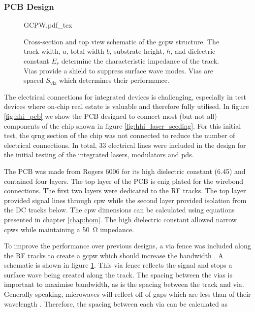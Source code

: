 
\subsubsection*{PCB Design}

\begin{figure}[t]
	\centering	
	\def\svgwidth{\textwidth} 
	{GCPW.pdf_tex}
	\caption[Grounded coplanar waveguide schematic]{Cross-section and top view schematic of the \acf{gcpw} structure. The track width, $a$, total width $b$, substrate height, $h$, and dielectric constant $E_r$ determine the characteristic impedance of the track. Vias provide a shield to suppress surface wave modes. Vias are spaced $S_\text{via}$ which determines their performance.}
	\label{fig:gcpw}
\end{figure}

The electrical connections for integrated devices is challenging, especially in test devices where on-chip real estate is valuable and therefore fully utilised. In figure \ref{fig:hhi_pcb} we show the PCB designed to connect most (but not all) components of the chip shown in figure \ref{fig:hhi_laser_seeding}. For this initial test, the \ac{qrng} section of the chip was not connected to reduce the number of electrical connections. In total, 33 electrical lines were included in the design for the initial testing of the integrated lasers, modulators and \acp{pd}.

The PCB was made from Rogers 6006 for its high dielectric constant (6.45) and contained four layers. The top layer of the PCB is \ac{enig} plated for the wirebond connections. The first two layers were dedicated to the RF tracks. The top layer provided signal lines through \ac{cpw} while the second layer provided isolation from the DC tracks below. The \ac{cpw} dimensions can be calculated using equations presented in chapter \ref{chap:hom}. The high dielectric constant allowed narrow \acp{cpw} while maintaining a \SI{50}{\ohm} impedance. 

To improve the performance over previous designs, a via fence was included along the RF tracks to create a \ac{gcpw} which should increase the bandwidth \cite{haydl2002use}. A schematic is shown in figure \ref{fig:gcpw}. This via fence reflects the signal and stops a surface wave being created along the track. The spacing between the vias is important to maximise bandwidth, as is the spacing between the track and via. Generally speaking, microwaves will reflect off of gaps which are less than  of their wavelength \cite{Sain2016}. Therefore, the spacing between each via can be calculated as 

